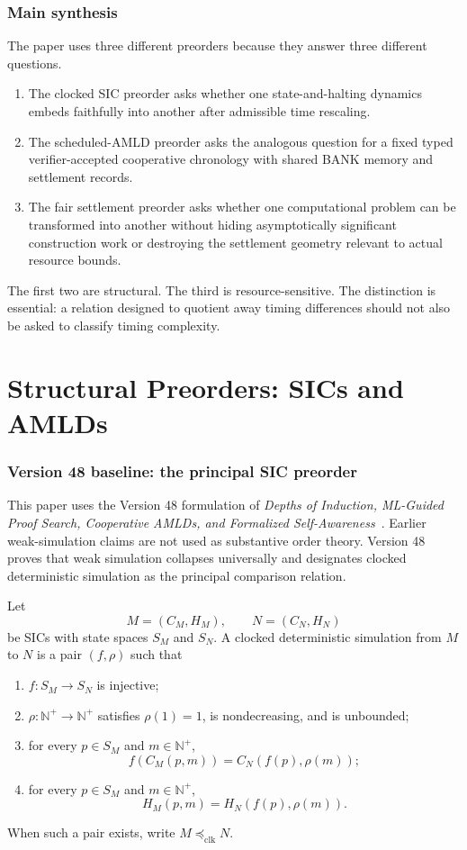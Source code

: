 \documentclass[11pt]{article}
\theoremstyle{definition}
\newcommand{\preclk}{\preceq_{\mathrm{clk}}}
\newcommand{\N}{\mathbb{N}}
\begin{document}
\section*{Main synthesis}
The paper uses three different preorders because they answer three different questions.
\begin{enumerate}[label=(\arabic*)]
    \item The clocked SIC preorder asks whether one state-and-halting dynamics embeds faithfully into another after admissible time rescaling.
    \item The scheduled-AMLD preorder asks the analogous question for a fixed typed verifier-accepted cooperative chronology with shared BANK memory and settlement records.
    \item The fair settlement preorder asks whether one computational problem can be transformed into another without hiding asymptotically significant construction work or destroying the settlement geometry relevant to actual resource bounds.
\end{enumerate}
The first two are structural. The third is resource-sensitive. The distinction is essential: a relation designed to quotient away timing differences should not also be asked to classify timing complexity.

\part{Structural Preorders: SICs and AMLDs}

\section{Version 48 baseline: the principal SIC preorder}
This paper uses the Version 48 formulation of \emph{Depths of Induction, ML-Guided Proof Search, Cooperative AMLDs, and Formalized Self-Awareness}~\cite{TennesonV48}. Earlier weak-simulation claims are not used as substantive order theory. Version 48 proves that weak simulation collapses universally and designates clocked deterministic simulation as the principal comparison relation.

Let
\[
M=(C_M,H_M),\qquad N=(C_N,H_N)
\]
be SICs with state spaces $S_M$ and $S_N$. A clocked deterministic simulation from $M$ to $N$ is a pair $(f,\rho)$ such that
\begin{enumerate}[label=(\roman*)]
    \item $f:S_M\to S_N$ is injective;
    \item $\rho:\N^+\to\N^+$ satisfies $\rho(1)=1$, is nondecreasing, and is unbounded;
    \item for every $p\in S_M$ and $m\in\N^+$,
    \[
    f(C_M(p,m))=C_N(f(p),\rho(m));
    \]
    \item for every $p\in S_M$ and $m\in\N^+$,
    \[
    H_M(p,m)=H_N(f(p),\rho(m)).
    \]
\end{enumerate}
When such a pair exists, write $M\preclk N$.
\end{document}
